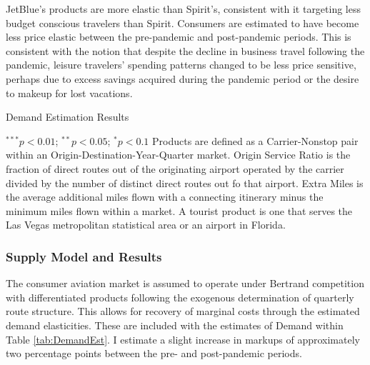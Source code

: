 \documentclass{article}
\begin{document}
     JetBlue's products are more elastic than Spirit's, consistent with it targeting less budget conscious travelers than Spirit. Consumers are estimated to have become less price elastic between the pre-pandemic and post-pandemic periods. This is consistent with the notion that despite the decline in business travel following the pandemic, leisure travelers' spending patterns changed to be less price sensitive, perhaps due to excess savings acquired during the pandemic period or the desire to makeup for lost vacations.   
    
    \begin{table}
        \caption{Demand Estimation Results}
        \label{tab:DemandEst}
        \vspace{-15mm}
        \begin{center}
        
                \footnotesize{$^{***}p<0.01$; $^{**}p<0.05$; $^{*}p<0.1$ Products are defined as a Carrier-Nonstop pair within an Origin-Destination-Year-Quarter market. Origin Service Ratio is the fraction of direct routes out of the originating airport operated by the carrier divided by the number of distinct direct routes out fo that airport. Extra Miles is the average additional miles flown with a connecting itinerary minus the minimum miles flown within a market.  A tourist product is one that serves the Las Vegas metropolitan statistical area or an airport in Florida.}

        \end{center}
    \end{table}
		
	\subsubsection{Supply Model and Results}
	\label{sec:Analysis_Supply}
	The consumer aviation market is assumed to operate under Bertrand competition with differentiated products following the exogenous determination of quarterly route structure. This allows for recovery of marginal costs through the estimated demand elasticities.  These are included with the estimates of Demand within Table \ref{tab:DemandEst}. I estimate a slight increase in markups of approximately two percentage points between the pre- and post-pandemic periods. 
	
	
\end{document}
